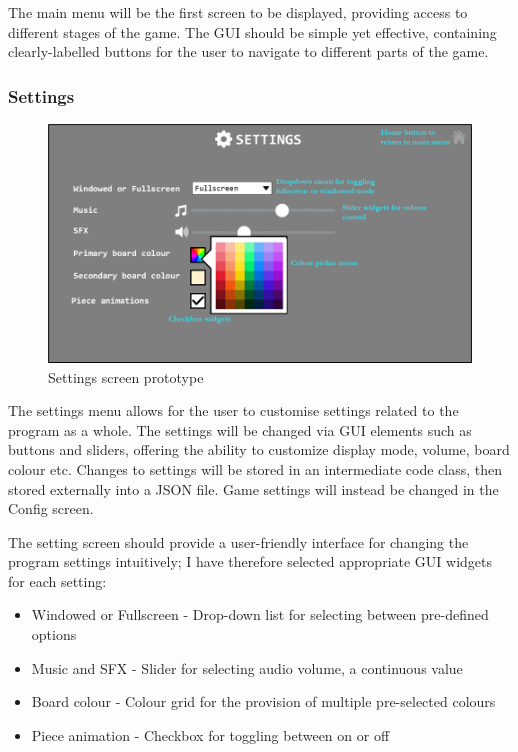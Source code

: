 \documentclass[../main/main.tex]{subfiles}
\begin{document}
The main menu will be the first screen to be displayed, providing access to different stages of the game. The GUI should be simple yet effective, containing clearly-labelled buttons for the user to navigate to different parts of the game.

\subsubsection{Settings}
\begin{figure}[H]
    \centering
    \includegraphics[width=0.8\columnwidth]{../design/assets/settings_gui.png}
    \caption{Settings screen prototype}
    \label{fig:settings-gui}
\end{figure}

The settings menu allows for the user to customise settings related to the program as a whole. The settings will be changed via GUI elements such as buttons and sliders, offering the ability to customize display mode, volume, board colour etc. Changes to settings will be stored in an intermediate code class, then stored externally into a JSON file. Game settings will instead be changed in the Config screen.

The setting screen should provide a user-friendly interface for changing the program settings intuitively; I have therefore selected appropriate GUI widgets for each setting:

\begin{itemize}
\item Windowed or Fullscreen - Drop-down list for selecting between pre-defined options
\item Music and SFX - Slider for selecting audio volume, a continuous value
\item Board colour - Colour grid for the provision of multiple pre-selected colours
\item Piece animation - Checkbox for toggling between on or off
\end{itemize}
\end{document}

